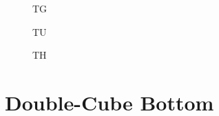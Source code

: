 \documentclass[a4paper,10pt]{article}
\begin{document}
\begin{landscape}
\begin{figure}[ht]
\begin{minipage}[b]{0.33\linewidth}
\caption{TG}
\label{fig:figure1}
\end{minipage}
\hspace{0.5cm}
\begin{minipage}[b]{0.33\linewidth}
\centering
   \fbox{\texttt{[image: TU]}}
\caption{TU}
\label{fig:figure2}
\end{minipage}
\begin{minipage}[b]{0.33\linewidth}
\centering
\caption{TH}
\label{fig:figure1}
\end{minipage}
\end{figure}


\section{Double-Cube Bottom}


\end{landscape}
\end{document}
